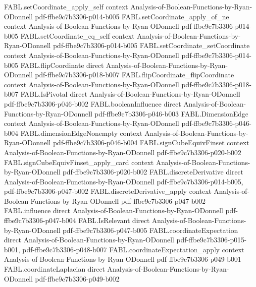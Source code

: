 \begin{theorem}
\proofstep
  {FABL.setCoordinate_apply_self}
  {context}
  {Analysis-of-Boolean-Functions-by-Ryan-ODonnell}
  {pdf-ffbe9c7b3306-p014-b005}
\proofstep
  {FABL.setCoordinate_apply_of_ne}
  {context}
  {Analysis-of-Boolean-Functions-by-Ryan-ODonnell}
  {pdf-ffbe9c7b3306-p014-b005}
\proofstep
  {FABL.setCoordinate_eq_self}
  {context}
  {Analysis-of-Boolean-Functions-by-Ryan-ODonnell}
  {pdf-ffbe9c7b3306-p014-b005}
\proofstep
  {FABL.setCoordinate_setCoordinate}
  {context}
  {Analysis-of-Boolean-Functions-by-Ryan-ODonnell}
  {pdf-ffbe9c7b3306-p014-b005}
\proofstep
  {FABL.flipCoordinate}
  {direct}
  {Analysis-of-Boolean-Functions-by-Ryan-ODonnell}
  {pdf-ffbe9c7b3306-p018-b007}
\proofstep
  {FABL.flipCoordinate_flipCoordinate}
  {context}
  {Analysis-of-Boolean-Functions-by-Ryan-ODonnell}
  {pdf-ffbe9c7b3306-p018-b007}
\proofstep
  {FABL.IsPivotal}
  {direct}
  {Analysis-of-Boolean-Functions-by-Ryan-ODonnell}
  {pdf-ffbe9c7b3306-p046-b002}
\proofstep
  {FABL.booleanInfluence}
  {direct}
  {Analysis-of-Boolean-Functions-by-Ryan-ODonnell}
  {pdf-ffbe9c7b3306-p046-b003}
\proofstep
  {FABL.DimensionEdge}
  {context}
  {Analysis-of-Boolean-Functions-by-Ryan-ODonnell}
  {pdf-ffbe9c7b3306-p046-b004}
\proofstep
  {FABL.dimensionEdgeNonempty}
  {context}
  {Analysis-of-Boolean-Functions-by-Ryan-ODonnell}
  {pdf-ffbe9c7b3306-p046-b004}
\proofstep
  {FABL.signCubeEquivFinset}
  {context}
  {Analysis-of-Boolean-Functions-by-Ryan-ODonnell}
  {pdf-ffbe9c7b3306-p020-b002}
\proofstep
  {FABL.signCubeEquivFinset_apply_card}
  {context}
  {Analysis-of-Boolean-Functions-by-Ryan-ODonnell}
  {pdf-ffbe9c7b3306-p020-b002}
\proofstep
  {FABL.discreteDerivative}
  {direct}
  {Analysis-of-Boolean-Functions-by-Ryan-ODonnell}
  {pdf-ffbe9c7b3306-p014-b005,
    pdf-ffbe9c7b3306-p047-b002}
\proofstep
  {FABL.discreteDerivative_apply}
  {context}
  {Analysis-of-Boolean-Functions-by-Ryan-ODonnell}
  {pdf-ffbe9c7b3306-p047-b002}
\proofstep
  {FABL.influence}
  {direct}
  {Analysis-of-Boolean-Functions-by-Ryan-ODonnell}
  {pdf-ffbe9c7b3306-p047-b004}
\proofstep
  {FABL.IsRelevant}
  {direct}
  {Analysis-of-Boolean-Functions-by-Ryan-ODonnell}
  {pdf-ffbe9c7b3306-p047-b005}
\proofstep
  {FABL.coordinateExpectation}
  {direct}
  {Analysis-of-Boolean-Functions-by-Ryan-ODonnell}
  {pdf-ffbe9c7b3306-p015-b001,
    pdf-ffbe9c7b3306-p048-b007}
\proofstep
  {FABL.coordinateExpectation_apply}
  {context}
  {Analysis-of-Boolean-Functions-by-Ryan-ODonnell}
  {pdf-ffbe9c7b3306-p049-b001}
\proofstep
  {FABL.coordinateLaplacian}
  {direct}
  {Analysis-of-Boolean-Functions-by-Ryan-ODonnell}
  {pdf-ffbe9c7b3306-p049-b002}

\end{theorem}

